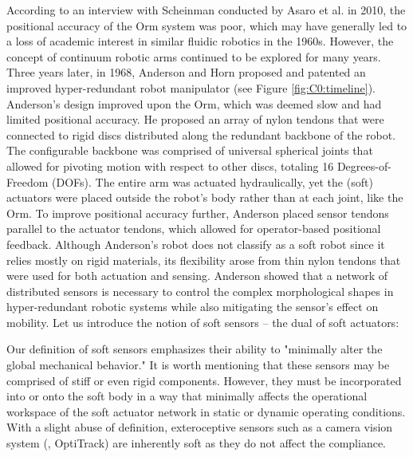 According to an interview with Scheinman conducted by Asaro et al. \cite{ETHW2020Dec} in 2010, the positional accuracy of the Orm system was poor, which may have generally led to a loss of academic interest in similar fluidic robotics in the 1960s. However, the concept of continuum robotic arms continued to be explored for many years. Three years later, in 1968, Anderson and Horn proposed and patented an improved hyper-redundant robot manipulator (see Figure \ref{fig:C0:timeline}). Anderson's design improved upon the Orm, which was deemed slow and had limited positional accuracy. He proposed an array of nylon tendons that were connected to rigid discs distributed along the redundant backbone of the robot. The configurable backbone was comprised of universal spherical joints that allowed for pivoting motion with respect to other discs, totaling 16 Degrees-of-Freedom (DOFs). The entire arm was actuated hydraulically, yet the (soft) actuators were placed outside the robot's body rather than at each joint, like the Orm. To improve positional accuracy further, Anderson placed sensor tendons parallel to the actuator tendons, which allowed for operator-based positional feedback. Although Anderson's robot does not classify as a soft robot since it relies mostly on rigid materials, its flexibility arose from thin nylon tendons that were used for both actuation and sensing. Anderson showed that a network of distributed sensors is necessary to control the complex morphological shapes in hyper-redundant robotic systems while also mitigating the sensor's effect on mobility. Let us introduce the notion of soft sensors -- the dual of soft actuators:
%
\vspace{1mm}
%
\begin{rmk}
\vspace{-5mm}
Our definition of soft sensors emphasizes their ability to "minimally alter the global mechanical behavior." It is worth mentioning that these sensors may be comprised of stiff or even rigid components. However, they must be incorporated into or onto the soft body in a way that minimally affects the operational workspace of the soft actuator network in static or dynamic operating conditions. With a slight abuse of definition, exteroceptive sensors such as a camera vision system (\eg, OptiTrack) are inherently soft as they do not affect the compliance.
\end{rmk} 


